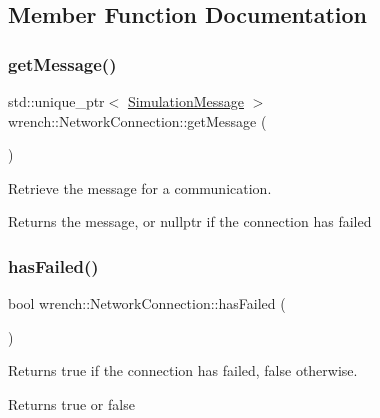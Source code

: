 \subsection{Member Function Documentation}
\mbox{\label{classwrench_1_1_network_connection_a4d17be0643165325bf8f2b83bf1e64a3}} 
\subsubsection{\texorpdfstring{get\+Message()}{getMessage()}}
{\footnotesize\ttfamily std\+::unique\+\_\+ptr$<$ \hyperlink{classwrench_1_1_simulation_message}{Simulation\+Message} $>$ wrench\+::\+Network\+Connection\+::get\+Message (\begin{DoxyParamCaption}{ }\end{DoxyParamCaption})}



Retrieve the message for a communication. 

\begin{DoxyReturn}{Returns}
the message, or nullptr if the connection has failed 
\end{DoxyReturn}
\mbox{\label{classwrench_1_1_network_connection_a23c3623053c93250d5b57b331a49e8eb}} 
\subsubsection{\texorpdfstring{has\+Failed()}{hasFailed()}}
{\footnotesize\ttfamily bool wrench\+::\+Network\+Connection\+::has\+Failed (\begin{DoxyParamCaption}{ }\end{DoxyParamCaption})}



Returns true if the connection has failed, false otherwise. 

\begin{DoxyReturn}{Returns}
true or false 
\end{DoxyReturn}
\mbox{\label{classwrench_1_1_network_connection_a60eb6e8c18895c69e0b744b8230b5471}} 
